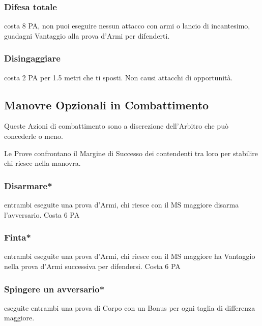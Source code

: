 \documentclass[12pt,a4paper,twoside,openany]{book}
\begin{document}
\begin{multicols}{2}
\subsubsection{Difesa totale} \label{difesatotale}

costa 8 PA, non puoi eseguire nessun attacco con armi o lancio di incantesimo, guadagni Vantaggio alla prova d'Armi per difenderti.

\subsubsection{Disingaggiare} \label{disingaggiare}

costa 2 PA per 1.5 metri che ti sposti. Non causi attacchi di opportunità.

\subsection{Manovre Opzionali in Combattimento}\label{azioniopzionaliincombattimento}

Queste Azioni di combattimento sono a discrezione dell'Arbitro che può concederle o meno.

Le Prove confrontano il Margine di Successo dei contendenti tra loro per stabilire chi riesce nella manovra.

\subsubsection{Disarmare*}\label{disarmare}

entrambi eseguite una prova d'Armi, chi riesce con il MS maggiore disarma l'avversario. Costa 6 PA

\subsubsection{Finta*} \label{finta}

entrambi eseguite una prova d'Armi, chi riesce con il MS maggiore ha Vantaggio nella prova d'Armi successiva per difendersi. Costa 6 PA

\subsubsection{Spingere un avversario*} \label{spingereavversario}\hypertarget{spingereavversario}{}

eseguite entrambi una prova di Corpo con un Bonus per ogni taglia di differenza maggiore.


\end{multicols}
\end{document}
